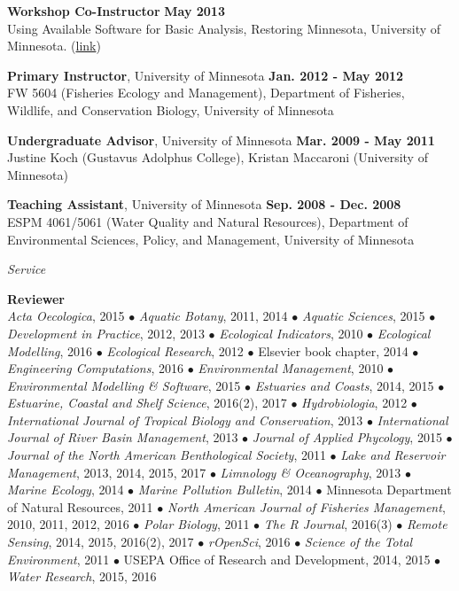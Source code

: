 \documentclass[letterpaper,12pt]{article}
\newcommand{\sectitle}[1]{\vspace{\baselineskip} \centerline{\large{\textit{#1}}}}
\begin{document}
{\bf Workshop Co-Instructor} \hfill {\bf May 2013} \\
Using Available Software for Basic Analysis, Restoring Minnesota, University of Minnesota. (\href{http://cceevents.umn.edu/restoring-minnesota/workshop}{link})

{\bf Primary Instructor}, University of Minnesota \hfill {\bf Jan. 2012 - May 2012} \\
FW 5604 (Fisheries Ecology and Management), Department of Fisheries, Wildlife, and Conservation Biology, University of Minnesota

{\bf Undergraduate Advisor}, University of Minnesota \hfill {\bf Mar. 2009 - May 2011} \\
Justine Koch (Gustavus Adolphus College), Kristan Maccaroni (University of Minnesota)

{\bf Teaching Assistant}, University of Minnesota \hfill {\bf Sep. 2008 - Dec. 2008} \\
ESPM 4061/5061 (Water Quality and Natural Resources), Department of Environmental Sciences, Policy, and Management, University of Minnesota

\sectitle{Service}

{\bf Reviewer}\hfill \\
\textit{Acta Oecologica}, 2015 $\bullet$ \textit{Aquatic Botany}, 2011, 2014 $\bullet$ \textit{Aquatic Sciences}, 2015 $\bullet$ \textit{Development in Practice}, 2012, 2013 $\bullet$ \textit{Ecological Indicators}, 2010 $\bullet$ \textit{Ecological Modelling}, 2016 $\bullet$ \textit{Ecological Research}, 2012 $\bullet$ Elsevier book chapter, 2014 $\bullet$ \textit{Engineering Computations}, 2016 $\bullet$ \textit{Environmental Management}, 2010 $\bullet$ \textit{Environmental Modelling \& Software}, 2015 $\bullet$ \textit{Estuaries and Coasts}, 2014, 2015 $\bullet$ \textit{Estuarine, Coastal and Shelf Science}, 2016(2), 2017 $\bullet$ \textit{Hydrobiologia}, 2012 $\bullet$ \textit{International Journal of Tropical Biology and Conservation}, 2013 $\bullet$ \textit{International Journal of River Basin Management}, 2013 $\bullet$ \textit{Journal of Applied Phycology}, 2015 $\bullet$ \textit{Journal of the North American Benthological Society}, 2011 $\bullet$ \textit{Lake and Reservoir Management}, 2013, 2014, 2015, 2017 $\bullet$ \textit{Limnology \& Oceanography}, 2013 $\bullet$ \textit{Marine Ecology}, 2014 $\bullet$ \textit{Marine Pollution Bulletin}, 2014 $\bullet$ Minnesota Department of Natural Resources, 2011 $\bullet$ \textit{North American Journal of Fisheries Management}, 2010, 2011, 2012, 2016 $\bullet$ \textit{Polar Biology}, 2011 $\bullet$ \textit{The R Journal}, 2016(3) $\bullet$ \textit{Remote Sensing}, 2014, 2015, 2016(2), 2017 $\bullet$ \textit{rOpenSci}, 2016 $\bullet$ \textit{Science of the Total Environment}, 2011 $\bullet$ USEPA Office of Research and Development, 2014, 2015 $\bullet$ \textit{Water Research}, 2015, 2016
\end{document}
